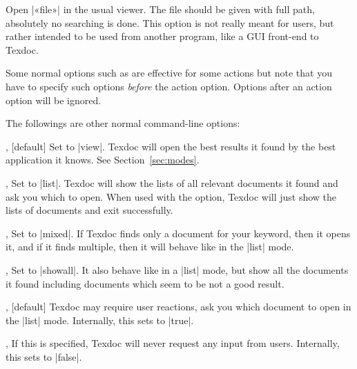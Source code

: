 \documentclass{texdoc-doc}
\begin{document}
\begin{clopt}{}
Open |«file»| in the usual viewer. The file should be given with full path,
absolutely no searching is done. This option is not really meant for users,
but rather intended to be used from another program, like a GUI front-end to
Texdoc.
\end{clopt}

Some normal options such as  are effective for some actions but note
that you have to specify such options \emph{before} the action option. Options
after an action option will be ignored.

The followings are other normal command-line options:

\begin{clopt}{, }[default]
Set  to |view|. Texdoc will open the best results it found by the best
application it knows. See Section~\ref{sec:modes}.
\end{clopt}

\begin{clopt}{, }
Set  to |list|. Texdoc will show the lists of all relevant documents
it found and ask you which to open. When used with the 
option, Texdoc will just show the lists of documents and exit successfully.
\end{clopt}

\begin{clopt}{, }
Set  to |mixed|. If Texdoc finds only a document for your keyword,
then it opens it, and if it finds multiple, then it will behave like in the
|list| mode.
\end{clopt}

\begin{clopt}{, }
Set  to |showall|. It also behave like in a |list| mode, but show all
the documents it found including documents which seem to be not a good result.
\end{clopt}

\begin{clopt}{, }[default]
Texdoc may require user reactions, \eg ask you which document to open in the
|list| mode. Internally, this sets  to |true|.
\end{clopt}

\begin{clopt}{, }
If this is specified, Texdoc will never request any input from users.
Internally, this sets  to |false|.
\end{clopt}
\end{document}
